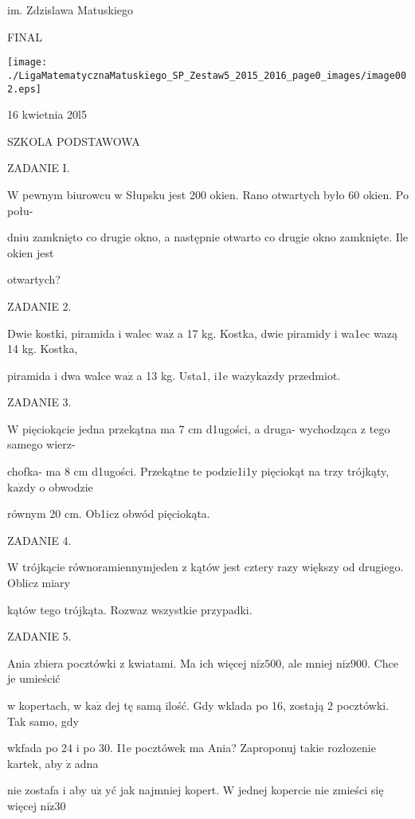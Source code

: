 \documentclass[a4paper,12pt]{article}
\begin{document}
im. Zdzislawa Matuskiego

FINAL
\begin{center}
\texttt{[image: ./LigaMatematycznaMatuskiego\_SP\_Zestaw5\_2015\_2016\_page0\_images/image002.eps]}
\end{center}
16 kwietnia 20l5

SZKOLA PODSTAWOWA

ZADANIE I.

W pewnym biurowcu w Słupsku jest 200 okien. Rano otwartych było 60 okien. Po połu-

dniu zamknięto co drugie okno, a następnie otwarto co drugie okno zamknięte. Ile okien jest

otwartych?

ZADANIE 2.

Dwie kostki, piramida i walec $\mathrm{w}\mathrm{a}\dot{\mathrm{z}}$ a 17 kg. Kostka, dwie piramidy i wa1ec wazą 14 kg. Kostka,

piramida i dwa walce $\mathrm{w}\mathrm{a}\dot{\mathrm{z}}$ a 13 kg. Usta1, i1e $\mathrm{w}\mathrm{a}\dot{\mathrm{z}}\mathrm{y}\mathrm{k}\mathrm{a}\dot{\mathrm{z}}\mathrm{d}\mathrm{y}$ przedmiot.

ZADANIE 3.

$\mathrm{W}$ pięciokącie jedna przekątna ma 7 cm d1ugości, a druga- wychodząca z tego samego wierz-

chofka- ma 8 cm d1ugości. Przekątne te podzie1i1y pięciokąt na trzy trójkąty, $\mathrm{k}\mathrm{a}\dot{\mathrm{z}}\mathrm{d}\mathrm{y}$ o obwodzie

równym 20 cm. Ob1icz obwód pięciokąta.

ZADANIE 4.

W trójkącie równoramiennymjeden z kątów jest cztery razy większy od drugiego. Oblicz miary

kątów tego trójkąta. Rozwaz wszystkie przypadki.

ZADANIE 5.

Ania zbiera pocztówki z kwiatami. Ma ich więcej $\mathrm{n}\mathrm{i}\dot{\mathrm{z}}500$, ale mniej $\mathrm{n}\mathrm{i}\dot{\mathrm{z}}900$. Chce je umieścić

w kopertach, w $\mathrm{k}\mathrm{a}\dot{\mathrm{z}}$ dej tę samą ilość. Gdy wklada po 16, zostają 2 pocztówki. Tak samo, gdy

wkfada po 24 i po 30. I1e pocztówek ma Ania? Zaproponuj takie rozłozenie kartek, aby $\dot{\mathrm{z}}$ adna

nie zostafa i aby $\mathrm{u}\dot{\mathrm{z}}$ yć jak najmniej kopert. $\mathrm{W}$ jednej kopercie nie zmieści się więcej $\mathrm{n}\mathrm{i}\dot{\mathrm{z}} 30$
\end{document}
